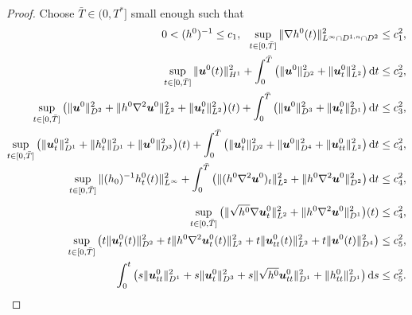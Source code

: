 \documentclass[10pt,a4paper]{amsart}
\begin{document}
\begin{proof}
Choose $\bar{T}\in (0,T^*]$ small enough such that
\begin{align}
\begin{aligned}
0<(h^0)^{-1}\leq c_1,\ \
\sup_{t\in[0,\bar{T}]}\|\nabla h^0(t)\|^2_{L^\infty\cap D^{1,n}\cap D^2}&\leq c^2_1,\notag\\
\sup_{t\in[0,\bar{T}]}\|\boldsymbol{u}^0(t)\|^2_{H^1}
+\int^{\bar{T}}_0\big(\|\boldsymbol{u}^0\|^2_{D^2}+\|\boldsymbol{u}^0_t\|^2_{L^2}\big)\,\mathrm{d}t&\leq c_2^2,\notag
\end{aligned}\\
\begin{aligned}\label{it0}
\sup_{t\in[0,\bar{T}]}\big(\|\boldsymbol{u}^0\|_{D^2}^2+\|h^0\nabla^2\boldsymbol{u}^0\|^2_{L^2}+\|\boldsymbol{u}^0_t\|^2_{L^2}\big)(t)
+\int^{\bar{T}}_0\big(\|\boldsymbol{u}^0\|^2_{D^3}+\|\boldsymbol{u}^0_t\|^2_{D^1}\big)\,\mathrm{d}t\leq c_3^2,\\
\sup_{t\in[0,\bar{T}]}\big(\|\boldsymbol{u}^0_t\|^2_{D^1}+\|h^0_t\|^2_{D^1}+\|\boldsymbol{u}^0\|^2_{D^3}\big)(t)
+\int^{\bar{T}}_0\big(\|\boldsymbol{u}^0_t\|^2_{D^2}+\|\boldsymbol{u}^0\|^2_{D^4}+\|\boldsymbol{u}^0_{tt}\|^2_{L^2}\big)\,\mathrm{d}t
\leq c_4^2,\\[-2pt]
\sup_{t\in[0,\bar{T}]}\|(h_0)^{-1}h^0_t(t)\|^2_{L^{\infty}}
+\int^{\bar{T}}_0\big(\|(h^0\nabla^2\boldsymbol{u}^0)_t\|^2_{L^2}+\|h^0\nabla^2\boldsymbol{u}^0\|^2_{D^2}\big)\,\mathrm{d}t\leq c_4^2,\\[4pt]
\sup_{t\in[0,\bar{T}]}\big(\|\sqrt{h^0}\nabla \boldsymbol{u}^0_t\|^2_{L^2}+\|h^0\nabla^2\boldsymbol{u}^0\|^2_{D^1}\big)(t)\leq c^2_4,
\end{aligned}\\[1pt]
\begin{aligned} 
\sup_{t\in[0,\bar{T}]}\big(t\|\boldsymbol{u}^0_t(t)\|^2_{D^2}+t\|h^0\nabla^2\boldsymbol{u}^0_t(t)\|^2_{L^2}+t\|\boldsymbol{u}^0_{tt}(t)\|^2_{L^2}+t\|\boldsymbol{u}^0(t)\|^2_{D^4}\big)\leq  c_5^2,\\
\int^t_0\big(s\|\boldsymbol{u}^0_{tt}\|_{D^1}^2+s\|\boldsymbol{u}^0_t\|^2_{D^3}+s\|\sqrt{h^0} \boldsymbol{u}^0_{tt}\|_{D^1}^2+\|h^0_{tt}\|^2_{D^1}\big)\,\mathrm{d}s\leq  c_5^2.\notag
\end{aligned}
\end{align}
 



\end{proof}
\end{document}
